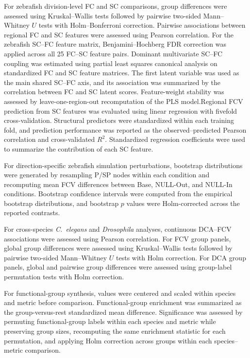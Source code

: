 \documentclass[9pt,twocolumn,twoside]{pnas-new}
\begin{document}
{For zebrafish division-level FC and SC comparisons, group differences were assessed using Kruskal--Wallis tests followed by pairwise two-sided Mann--Whitney $U$ tests with Holm--Bonferroni correction. Pairwise associations between regional FC and SC features were assessed using Pearson correlation. For the zebrafish SC--FC feature matrix, Benjamini--Hochberg FDR correction was applied across all 25 FC--SC feature pairs. Dominant multivariate SC--FC coupling was estimated using partial least squares canonical analysis on standardized FC and SC feature matrices. The first latent variable was used as the main shared SC--FC axis, and its association was summarized by the correlation between FC and SC latent scores. Feature-weight stability was assessed by leave-one-region-out recomputation of the PLS model.Regional FCV prediction from SC features was evaluated using linear regression with fivefold cross-validation. Structural predictors were standardized within each training fold, and prediction performance was reported as the observed--predicted Pearson correlation and cross-validated $R^2$. Standardized regression coefficients were used to summarize the contribution of each SC feature.

For direction-specific zebrafish simulation perturbations, bootstrap distributions were generated by resampling P/SP nodes within each condition and recomputing mean FCV differences between Base, NULL-Out, and NULL-In conditions. Bootstrap confidence intervals were computed from the empirical bootstrap distributions, and bootstrap $p$ values were Holm-corrected across the reported contrasts.

For cross-species \textit{C.~elegans} and \textit{Drosophila} analyses, continuous DCA--FCV associations were assessed using Pearson correlation. For FCV group panels, global group differences were assessed using Kruskal--Wallis tests followed by pairwise two-sided Mann--Whitney $U$ tests with Holm correction. For DCA group panels, global and pairwise group differences were assessed using group-label permutation tests with Holm correction.

For functional-group synthesis, values were centered and scaled within species and metric before comparison. Functional-group enrichment was summarized as the group-versus-rest standardized mean difference. Significance was assessed by permuting functional-group labels within each species and metric while preserving group sizes, recomputing the same enrichment statistic for each permutation, and applying Holm correction across groups within each species--metric comparison.

}
\end{document}
